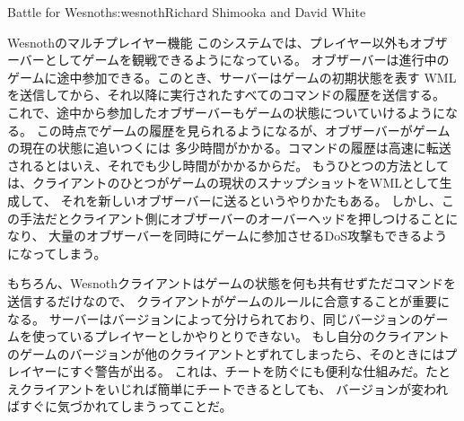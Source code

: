 \begin{aosachapter}{Battle for Wesnoth}{s:wesnoth}{Richard Shimooka and David White}
\begin{aosasect1}{Wesnothのマルチプレイヤー機能}
このシステムでは、プレイヤー以外もオブザーバーとしてゲームを観戦できるようになっている。
オブザーバーは進行中のゲームに途中参加できる。このとき、サーバーはゲームの初期状態を表す
WMLを送信してから、それ以降に実行されたすべてのコマンドの履歴を送信する。
これで、途中から参加したオブザーバーもゲームの状態についていけるようになる。
この時点でゲームの履歴を見られるようになるが、オブザーバーがゲームの現在の状態に追いつくには
多少時間がかかる。コマンドの履歴は高速に転送されるとはいえ、それでも少し時間がかかるからだ。
もうひとつの方法としては、クライアントのひとつがゲームの現状のスナップショットをWMLとして生成して、
それを新しいオブザーバーに送るというやりかたもある。
しかし、この手法だとクライアント側にオブザーバーのオーバーヘッドを押しつけることになり、
大量のオブザーバーを同時にゲームに参加させるDoS攻撃もできるようになってしまう。

もちろん、Wesnothクライアントはゲームの状態を何も共有せずただコマンドを送信するだけなので、
クライアントがゲームのルールに合意することが重要になる。
サーバーはバージョンによって分けられており、同じバージョンのゲームを使っているプレイヤーとしかやりとりできない。
もし自分のクライアントのゲームのバージョンが他のクライアントとずれてしまったら、そのときにはプレイヤーにすぐ警告が出る。
これは、チートを防ぐにも便利な仕組みだ。たとえクライアントをいじれば簡単にチートできるとしても、
バージョンが変わればすぐに気づかれてしまうってことだ。


\end{aosasect1}
\end{aosachapter}
